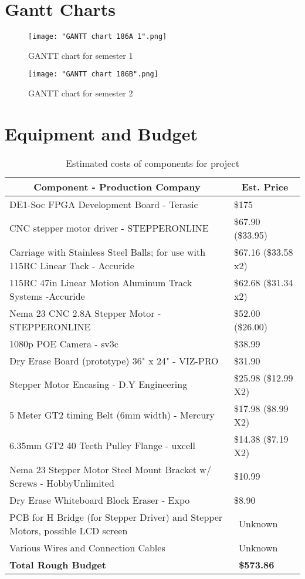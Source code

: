 \section{Gantt Charts}
\begin{figure}[h!]
	\centering
	\texttt{[image: "GANTT chart 186A 1".png]}
	\caption{GANTT chart for semester 1}
	\label{fig:GANTT186A}
\end{figure}

\newpage

\begin{figure}[h!]
	\centering
	{\texttt{[image: "GANTT chart 186B".png]}}
	\caption{GANTT chart for semester 2}
	\label{fig:GANTT186B}
\end{figure}

\section{Equipment and Budget}
\setlength{\parindent}{5ex}
\begin{table} [H]
	\normalsize
	\centering
	\begin{tabular}{|l|l|}
		\hline
		\multicolumn{1}{|c|}{\textbf{Component - Production Company}}  & \multicolumn{1}{|c|}{\textbf{Est. Price}} \\
		\hline
		DE1-Soc FPGA Development Board - Terasic & \$175 \\
		\hline
		CNC stepper motor driver - STEPPERONLINE & \$67.90 (\$33.95) \\
		\hline
		Carriage with Stainless Steel Balls; for use with 115RC Linear Tack - Accuride & \$67.16 (\$33.58 x2) \\ 
		\hline 		
		115RC 47in Linear Motion Aluminum Track Systems -Accuride & \$62.68 (\$31.34 x2) \\
		\hline
		Nema 23 CNC 2.8A Stepper Motor - STEPPERONLINE & \$52.00 (\$26.00) \\
		\hline
		1080p POE Camera - sv3c & \$38.99 \\
		\hline
		Dry Erase Board (prototype) 36" x 24" - VIZ-PRO & \$31.90 \\
		\hline
		Stepper Motor Encasing - D.Y Engineering & \$25.98 (\$12.99 X2) \\
		\hline
		5 Meter GT2 timing Belt (6mm width) - Mercury & \$17.98 (\$8.99 X2) \\
		\hline
		6.35mm GT2 40 Teeth Pulley Flange - uxcell & \$14.38 (\$7.19 X2) \\
		\hline
		Nema 23 Stepper Motor Steel Mount Bracket w/ Screws - HobbyUnlimited & \$10.99 \\
		\hline
		Dry Erase Whiteboard Block Eraser - Expo & \$8.90 \\
		\hline
		PCB for H Bridge (for Stepper Driver) and Stepper Motors, possible LCD screen & \ Unknown \\
		\hline
		Various Wires and Connection Cables & \ Unknown \\
		\hline 
		\textbf{Total Rough Budget} & \ \textbf{\$573.86} \\
		\hline 
	\end{tabular} 
	\caption{Estimated costs of components for project}
	\label{table:1}
\end{table}	

